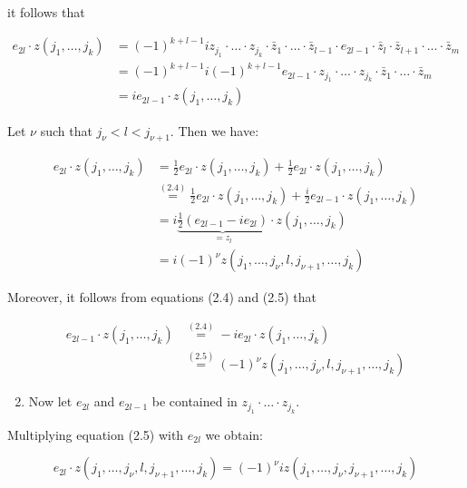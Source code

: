 \documentclass[10pt, letterpaper]{article}
\begin{document}
it follows that

$$
\begin{aligned}
e_{2 l} \cdot z\left(j_{1}, \ldots, j_{k}\right) & =(-1)^{k+l-1} i z_{j_{1}} \cdot \ldots \cdot z_{j_{k}} \cdot \bar{z}_{1} \cdot \ldots \cdot \bar{z}_{l-1} \cdot e_{2 l-1} \cdot \bar{z}_{l} \cdot \bar{z}_{l+1} \cdot \ldots \cdot \bar{z}_{m} \\
& =(-1)^{k+l-1} i(-1)^{k+l-1} e_{2 l-1} \cdot z_{j_{1}} \cdot \ldots \cdot z_{j_{k}} \cdot \bar{z}_{1} \cdot \ldots \cdot \bar{z}_{m} \\
& =i e_{2 l-1} \cdot z\left(j_{1}, \ldots, j_{k}\right)
\end{aligned}
$$

Let $\nu$ such that $j_{\nu}<l<j_{\nu+1}$. Then we have:

$$
\begin{aligned}
e_{2 l} \cdot z\left(j_{1}, \ldots, j_{k}\right) & =\frac{1}{2} e_{2 l} \cdot z\left(j_{1}, \ldots, j_{k}\right)+\frac{1}{2} e_{2 l} \cdot z\left(j_{1}, \ldots, j_{k}\right) \\
& \stackrel{(2.4)}{=} \frac{1}{2} e_{2 l} \cdot z\left(j_{1}, \ldots, j_{k}\right)+\frac{i}{2} e_{2 l-1} \cdot z\left(j_{1}, \ldots, j_{k}\right) \\
& =i \underbrace{\frac{1}{2}\left(e_{2 l-1}-i e_{2 l}\right)}_{=z_{l}} \cdot z\left(j_{1}, \ldots, j_{k}\right) \\
& =i(-1)^{\nu} z\left(j_{1}, \ldots, j_{\nu}, l, j_{\nu+1}, \ldots, j_{k}\right)
\end{aligned}
$$

Moreover, it follows from equations (2.4) and (2.5) that

$$
\begin{aligned}
e_{2 l-1} \cdot z\left(j_{1}, \ldots, j_{k}\right) & \stackrel{(2.4)}{=}-i e_{2 l} \cdot z\left(j_{1}, \ldots, j_{k}\right) \\
& \stackrel{(2.5)}{=}(-1)^{\nu} z\left(j_{1}, \ldots, j_{\nu}, l, j_{\nu+1}, \ldots, j_{k}\right)
\end{aligned}
$$

\begin{enumerate}
  \setcounter{enumi}{1}
  \item Now let $e_{2 l}$ and $e_{2 l-1}$ be contained in $z_{j_{1}} \cdot \ldots \cdot z_{j_{k}}$.
\end{enumerate}

Multiplying equation (2.5) with $e_{2 l}$ we obtain:

$$
e_{2 l} \cdot z\left(j_{1}, \ldots, j_{\nu}, l, j_{\nu+1}, \ldots, j_{k}\right)=(-1)^{\nu} i z\left(j_{1}, \ldots, j_{\nu}, j_{\nu+1}, \ldots, j_{k}\right)
$$
\end{document}
